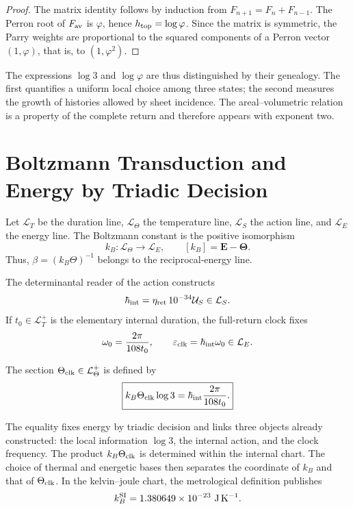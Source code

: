 \begin{proof}
The matrix identity follows by induction from
\(F_{n+1}=F_n+F_{n-1}\). The Perron root of \(F_{\rm av}\) is \(\varphi\),
hence \(h_{\rm top}=\log\varphi\). Since the matrix is symmetric, the Parry
weights \cite{Parry1964} are proportional to the squared components of a Perron vector
\((1,\varphi)\), that is, to \((1,\varphi^2)\).
\end{proof}

The expressions \(\log3\) and \(\log\varphi\) are thus distinguished by their
genealogy. The first quantifies a uniform local choice among three
states; the second measures the growth of histories allowed by
sheet incidence. The areal--volumetric relation is a property of the
complete return and therefore appears with exponent two.

\section{Boltzmann Transduction and Energy by Triadic Decision}

Let \(\mathcal L_T\) be the duration line, \(\mathcal L_\Theta\) the
temperature line, \(\mathcal L_S\) the action line, and \(\mathcal L_E\) the
energy line. The Boltzmann constant is the positive isomorphism
\begin{equation}
 \boxed{
 k_B:\mathcal L_\Theta\longrightarrow\mathcal L_E,
 \qquad [k_B]=\mathbf E-\boldsymbol\Theta.}
 \label{eq:boltzmann-transductor-anexo}
\end{equation}
Thus, \(\beta=(k_B\Theta)^{-1}\) belongs to the reciprocal-energy line.

The determinantal reader of the action constructs
\[
 \hbar_{\rm int}
 =\eta_{\rm ret}\,10^{-34}\mathcal U_S\in\mathcal L_S.
\]
If \(t_0\in\mathcal L_T^+\) is the elementary internal duration, the full-return
clock fixes
\[
 \omega_0=\frac{2\pi}{108t_0},
 \qquad
 \varepsilon_{\rm clk}=\hbar_{\rm int}\omega_0\in\mathcal L_E.
\]

\begin{definition}
The section \(\Theta_{\rm clk}\in\mathcal L_\Theta^+\) is defined by
\begin{equation}
 \boxed{
 k_B\Theta_{\rm clk}\log3
 =\hbar_{\rm int}\frac{2\pi}{108t_0}.}
 \label{eq:boltzmann-accion-informacion-anexo}
\end{equation}
\end{definition}

The equality fixes energy by triadic decision and links three objects already
constructed: the local information \(\log3\), the internal action, and the clock
frequency. The product \(k_B\Theta_{\rm clk}\) is determined within the
internal chart. The choice of thermal and energetic bases then separates the
coordinate of \(k_B\) and that of \(\Theta_{\rm clk}\). In the kelvin--joule chart,
the metrological definition publishes
\[
 k_B^{\rm SI}=1.380649\times10^{-23}\ \mathrm{J\,K^{-1}}.
\]

